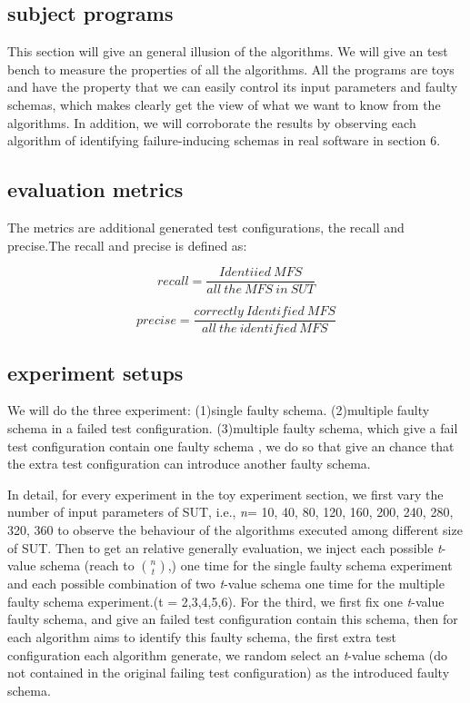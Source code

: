 \documentclass[10pt,journal,cspaper,compsoc]{IEEEtran}
\begin{document}
\subsection{subject programs}
This section will give an general illusion of the algorithms. We will give an test bench to measure the properties of all the algorithms. All the programs are toys and have the property that we can easily control its input parameters and faulty schemas, which makes clearly get the view of what we want to know from the algorithms. In addition, we will corroborate the results by observing each algorithm of identifying failure-inducing schemas in real software in section 6.

\subsection{evaluation metrics}
The metrics are additional generated test configurations, the recall and precise.The recall and precise  is defined as:

$$recall =
 \frac{Identiied\ MFS}{all\ the\ MFS\ in\ SUT}
$$

$$precise =
 \frac{correctly\ Identified\ MFS}{all\ the\ identified\ MFS}
$$
\subsection{experiment setups}
We will do the three experiment: (1)single faulty schema.  (2)multiple faulty schema in a failed test configuration. (3)multiple faulty schema, which give a fail test configuration contain one faulty schema , we do so that give an chance that the extra test configuration can introduce another faulty schema.

In detail, for every experiment in the toy experiment section, we first vary the number of input parameters of SUT, i.e., \emph{n}= 10, 40, 80, 120, 160, 200, 240, 280, 320, 360 to observe the behaviour of the algorithms executed among different size of SUT. Then to get an relative generally evaluation, we inject each possible \emph{t}-value schema (reach to $\binom{n}{t}$,) one time for the single faulty schema experiment and each possible combination of two \emph{t}-value schema one time for the multiple faulty schema experiment.(t = 2,3,4,5,6). For the third, we first fix one \emph{t}-value faulty schema, and give an failed test configuration contain this schema, then for each algorithm aims to identify this faulty schema, the first extra test configuration each algorithm generate, we random select an \emph{t}-value schema (do not contained in the original failing test configuration) as the introduced faulty schema.
\end{document}
